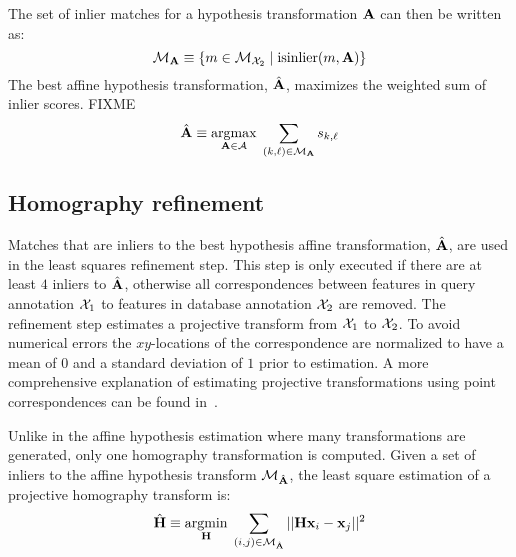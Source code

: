         The set of inlier matches for a hypothesis transformation $\mathbf{A}$ can then be written as:
        \begin{equation}\label{eqn:affinliers}
            \mathcal{M}_{\mathbf{A}} \equiv \left\{m \in \mathcal{M}_{\mathcal{X}_{2}} \mid \operatorname{isinlier}(m, \mathbf{A})\right\}
        \end{equation}
        The best affine hypothesis transformation, $\hat{\mathbf{A}}$, maximizes the weighted sum of inlier scores. %
        FIXME
        \begin{equation}
            \hat{\mathbf{A}} \equiv \underset{\mathbf{A} \in \mathcal{A}}{\operatorname{argmax}}\; 
                \sum_{(k, \ell) \in \mathcal{M}_{\mathbf{A}}} s_{k, \ell}
        \end{equation}

    \subsection{Homography refinement}
        Matches that are inliers to the best hypothesis affine transformation, $\hat{\mathbf{A}}$, are used in the
        least squares refinement step. This step is only executed if there are at least $4$ inliers to
        $\hat{\mathbf{A}}$, otherwise all correspondences between features in query annotation $\mathcal{X}_{1}$ to features
        in database annotation $\mathcal{X}_{2}$ are removed. The refinement step estimates a projective transform from
        $\mathcal{X}_{1}$ to  $\mathcal{X}_{2}$. To avoid numerical errors the $xy$-locations of the correspondence are normalized
        to have a mean of $0$ and a standard deviation of $1$ prior to estimation. A more comprehensive explanation
        of estimating projective transformations using point correspondences can be found
        in~\cite[311--320]{szeliski_computer_2010}.

        Unlike in the affine hypothesis estimation where many transformations are generated, only one homography
        transformation is computed. Given a set of inliers to the affine hypothesis transform
        $\mathcal{M}_{\hat{\mathbf{A}}}$, the least square estimation of a projective homography transform is:
        \begin{equation}
            \hat{\mathbf{H}} \equiv \underset{\mathbf{H}}{\operatorname{argmin}}\; \sum_{(i, j) \in
              \mathcal{M}_{\hat{\mathbf{A}}}} ||\mathbf{H} \mathbf{x}_{i} - \mathbf{x}_{j}||^2
        \end{equation}

